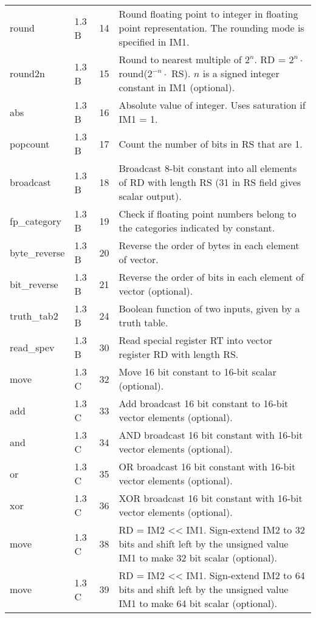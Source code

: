 \documentclass[forwardcom.tex]{subfiles}
\begin{document}
\begin{longtable} {|p{20mm}|p{10mm}|p{8mm}|p{75mm}|}
round         & 1.3 B & 14 & Round floating point to integer in floating point  representation. The rounding mode is specified in IM1. \\
round2n       & 1.3 B & 15 & Round to nearest multiple of $2^n$. \newline 
RD = $2^n\cdot$ round($2^{-n}\cdot$ RS). $n$ is a signed integer constant in IM1 (optional). \\
abs           & 1.3 B & 16 & Absolute value of integer. Uses saturation if IM1 = 1. \\
popcount      & 1.3 B & 17 & Count the number of bits in RS that are 1. \\
broadcast     & 1.3 B & 18 & Broadcast 8-bit constant into all elements of RD with length RS (31 in RS field gives scalar output). \\
fp\_category  & 1.3 B & 19 & Check if floating point numbers belong to the categories indicated by constant. \\
byte\_reverse & 1.3 B & 20 & Reverse the order of bytes in each element of vector. \\
bit\_reverse  & 1.3 B & 21 & Reverse the order of bits in each element of vector (optional). \\
truth\_tab2   & 1.3 B & 24 & Boolean function of two inputs, given by a truth table. \\
read\_spev    & 1.3 B & 30 & Read special register RT into vector register RD with  length RS. \\
move          & 1.3 C & 32 & Move 16 bit constant to 16-bit scalar (optional). \\
add           & 1.3 C & 33 & Add broadcast 16 bit constant to 16-bit vector elements (optional). \\
and           & 1.3 C & 34 & AND broadcast 16 bit constant with 16-bit vector elements (optional). \\
or            & 1.3 C & 35 & OR broadcast 16 bit constant with 16-bit vector elements (optional). \\
xor           & 1.3 C & 36 & XOR broadcast 16 bit constant with 16-bit vector elements (optional). \\
move          & 1.3 C & 38 & RD = IM2 \textless\textless{} IM1. Sign-extend IM2 to 32 bits and shift left by the unsigned value IM1 to make 32 bit scalar (optional). \\
move          & 1.3 C & 39 & RD = IM2 \textless\textless{} IM1. Sign-extend IM2 to 64 bits and shift left by the unsigned value IM1 to make 64 bit scalar (optional). \\

\end{longtable}
\end{document}
